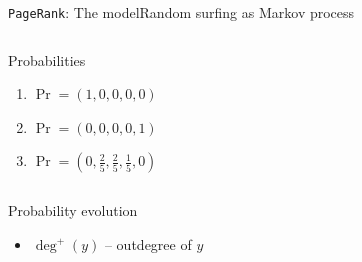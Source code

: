 \documentclass[xcolor=table,final]{beamer} %
\newcommand{\PageRank}{\texttt{PageRank}\xspace}
\begin{document}
\begin{frame}{\PageRank : The model}{Random surfing as Markov process}
\begin{columns}
    \begin{exampleblock}{Probabilities}
      \begin{enumerate}
      \item<2-> $\Pr = (1,0,0,0,0)$
      \item<3-> $\Pr = (0,0,0,0,1)$
      \item<4-> $\Pr = (0,\frac{2}{5},\frac{2}{5},\frac{1}{5},0)$
      \end{enumerate}
    \end{exampleblock}
  \end{columns}

  \pause 
  \begin{block}{Probability evolution}
    {\small
      \begin{itemize}
      \item $\deg^+(y)$ -- outdegree of $y$
      \end{itemize}
    }
  \end{block}
\end{frame}
\end{document}
